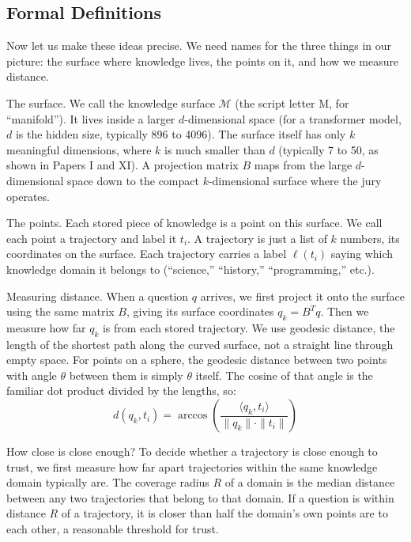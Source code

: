 \documentclass[11pt]{article}
\begin{document}
\subsection{Formal Definitions}

Now let us make these ideas precise. We need names for the three things in our
picture: the surface where knowledge lives, the points on it, and how we measure
distance.

The surface. We call the knowledge surface $\mathcal{M}$ (the script
letter M, for ``manifold''). It lives inside a larger $d$-dimensional space (for
a transformer model, $d$ is the hidden size, typically 896 to 4096). The
surface itself has only $k$ meaningful dimensions, where $k$ is much smaller
than $d$ (typically 7 to 50, as shown in Papers I and XI). A projection matrix
$B$ maps from the large $d$-dimensional space down to the compact $k$-dimensional
surface where the jury operates.

The points. Each stored piece of knowledge is a point on this surface.
We call each point a trajectory and label it $t_i$. A trajectory is
just a list of $k$ numbers, its coordinates on the surface. Each trajectory
carries a label $\ell(t_i)$ saying which knowledge domain it belongs to
(``science,'' ``history,'' ``programming,'' etc.).

Measuring distance. When a question $q$ arrives, we first project it
onto the surface using the same matrix $B$, giving its surface coordinates
$q_k = B^T q$. Then we measure how far $q_k$ is from each stored trajectory.
We use geodesic distance, the length of the shortest path along the curved
surface, not a straight line through empty space. For points on a sphere, the
geodesic distance between two points with angle $\theta$ between them is simply
$\theta$ itself. The cosine of that angle is the familiar dot product divided by
the lengths, so:
\begin{equation}
d(q_k, t_i) = \arccos\left(\frac{\langle q_k, t_i \rangle}{\|q_k\| \cdot \|t_i\|}\right)
\end{equation}

How close is close enough? To decide whether a trajectory is close
enough to trust, we first measure how far apart trajectories within the same
knowledge domain typically are. The coverage radius $R$ of a domain is
the median distance between any two trajectories that belong to that domain.
If a question is within distance $R$ of a trajectory, it is closer than half
the domain's own points are to each other, a reasonable threshold for trust.
\end{document}
